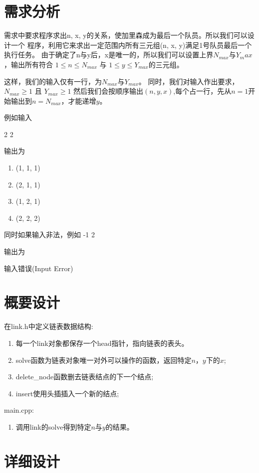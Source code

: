 \section{需求分析}
   需求中要求程序求出n, x, y的关系，使加里森成为最后一个队员。所以我们可以设计一个
程序，利用它来求出一定范围内所有三元组(n, x, y)满足1号队员最后一个执行任务。
由于确定了n与y后，x是唯一的，所以我们可以设置上界$N_{max}$与$Y_max$，输出所有符合
$1 \leqslant n \leqslant  N_{max}$ 与 $1 \leqslant y \leqslant  Y_{max}$的三元组。


这样，我们的输入仅有一行，为$N_{max}$与$Y_{max}$。
同时，我们对输入作出要求，$N_{max} \geqslant 1$ 且 $Y_{max} \geqslant 1$
然后我们会按顺序输出$(n, y, x)$,每个占一行，先从$n = 1$开始输出到$n = N_{max}$，才能递增$y$。

例如输入

   2 2


输出为
\begin{enumerate}
   \item (1, 1, 1)
   \item (2, 1, 1)
   \item (1, 2, 1)
   \item (2, 2, 2)
\end{enumerate}


同时如果输入非法，例如 -1 2


输出为


输入错误(Input Error)

\section{概要设计}
在link.h中定义链表数据结构:
\begin{enumerate}
   \item 每一个link对象都保存一个head指针，指向链表的表头。
   \item solve函数为链表对象唯一对外可以操作的函数，返回特定$n$，$y$下的$x$;
   \item delete\_node函数删去链表结点的下一个结点;
   \item insert使用头插插入一个新的结点;
\end{enumerate}


main.cpp:
\begin{enumerate}
   \item 调用link的solve得到特定$n$与$y$的结果。
\end{enumerate}

\section{详细设计}


